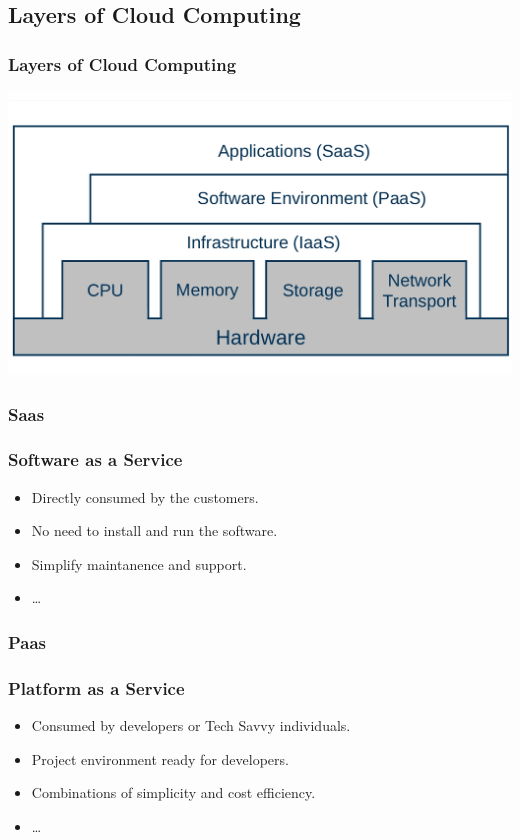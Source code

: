 \documentclass [12pt] {beamer}
\begin{document}
\subsection{Layers of Cloud Computing}
\begin{frame}
\frametitle{Layers of Cloud Computing}
\begin{center}
\includegraphics[scale=.2,keepaspectratio=true]{cclayers.jpg}
\end{center}
\end{frame}

\subsubsection{Saas}
\begin{frame}
\frametitle{Software as a Service}
\begin{itemize} [<+->]
 \item Directly consumed by the customers.
 \item No need to install and run the software.
 \item Simplify maintanence and support.
 \item \dots 
\end{itemize}
\end{frame}


\subsubsection{Paas} 
\begin{frame}
\frametitle{Platform as a Service}
\begin {itemize} [<+->]
 \item Consumed by developers or Tech Savvy individuals.
 \item Project environment ready for developers.
 \item Combinations of simplicity and cost efficiency.
 \item \dots
\end {itemize}
\end{frame}
\end{document}
